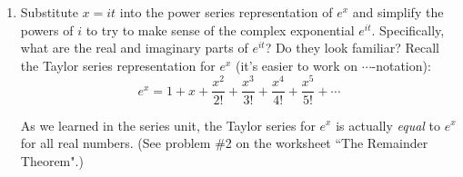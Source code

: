 \documentclass[main]{subfiles}
\begin{document}
\begin{enumerate}
\begin{solution}
  \begin{align*}
  r &= \frac{-b\pm \sqrt{b^2-4ac}}{2a}\\
  r&= \frac{-2\pm\sqrt{(2)^2-4(1)(5)}}{2(1)}\\
  r&=\frac{-2\pm\sqrt{4-20}}{2}\\
  r&=\frac{-2\pm\sqrt{-16}}{2}\\
  r&=\frac{-2\pm\sqrt{-1}\sqrt{16}}{2}\\
  r&= \frac{-2\pm4i}{2}\\
  r&=-1\pm2i
  \end{align*}
  Here, $i=\sqrt{-1}$ is the \textit{imaginary number}. In general, a \textit{complex number} $z$ is a number of the form $a+bi$, where $a$ and $b$ are real numbers. We refer to $a$ as the \textit{real part of $z$} and $b$ as the \textit{imaginary part of $z$}.
  
  Thus, this characteristic equation has two \textit{complex} roots, $r=-1+2i$ and $r=-1-2i$. Then, following our previous scheme, the general solution to the differential equation should be: 
  $$\boxed{x(t)=C_1e^{(-1+2i)t}+C_2e^{(-1-2i)t}}$$
  However, it is difficult to make any sense of this solution, as we do not know what it means to raise $e$ to a complex number. So the current format of the solution is not very useful for finding the position of the spring at any given time.
  \end{solution}
  
 \item 
 
  \begin{problem}[1.5in]
  Substitute $x = it$ into the power series representation of $e^x$ and simplify the powers of $i$ to try to make sense of the complex 
  exponential $e^{it}$.  Specifically, what are the real and imaginary parts of $e^{it}$? Do they look familiar? Recall the Taylor series representation for $e^x$ (it's easier to work on $\cdots$-notation):
  \[e^x = 1 + x + \frac{x^2}{2!} + \frac{x^3}{3!} + \frac{x^4}{4!} + \frac{x^5}{5!} + \cdots\]

  
  \end{problem}
  
  \begin{solution}
  As we learned in the series unit, the Taylor series for $e^x$ is actually \textit{equal} to $e^x$ for all real numbers. (See problem \#2 on the worksheet ``The Remainder Theorem".)
  

\end{solution}
\end{enumerate}
\end{document}
